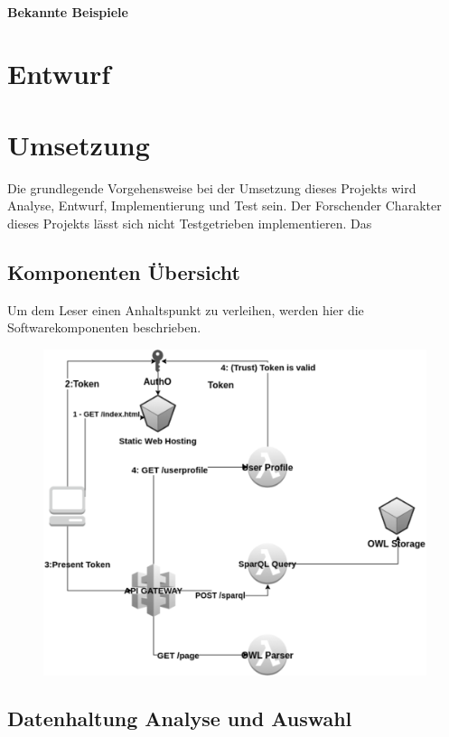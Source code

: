 \documentclass[
12pt,
english,
ngerman,
headsepline,
twoside,
openright,
numbers=noenddot,version=first
]{scrreprt}
\begin{document}
\paragraph{Bekannte Beispiele}

\section{Entwurf}
\label{chap:design}

\section{Umsetzung}
\label{chap:impl}
Die grundlegende Vorgehensweise bei der Umsetzung dieses Projekts wird Analyse, Entwurf, Implementierung und Test sein. Der Forschender Charakter dieses Projekts lässt sich nicht Testgetrieben implementieren.
Das


\subsection{Komponenten Übersicht}
\label{sec:components}
Um dem Leser einen Anhaltspunkt zu verleihen, werden hier die Softwarekomponenten beschrieben.

\begin{figure}[H]
	\includegraphics[width=\linewidth]{./pics/static-web-hosting.eps}
\end{figure}

\subsection{Datenhaltung Analyse und Auswahl}
\end{document}
